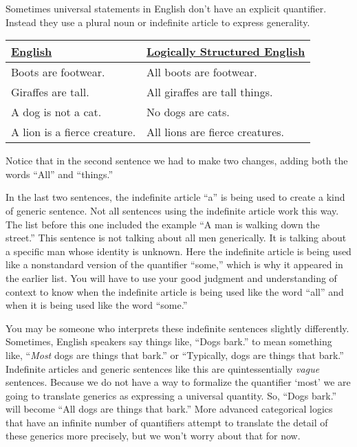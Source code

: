 Sometimes universal statements in English don't have an explicit quantifier. Instead they use a plural noun or indefinite article to express generality.

\begin{table}
\begin{longtabu}{p{.5\linewidth}p{.5\linewidth}}
\underline{English} &
\underline{Logically Structured English} \\
\endhead
Boots are footwear. & 
All boots are footwear.\\

Giraffes are tall. & 
All giraffes are tall things.\\

A dog is not a cat. & 
No dogs are cats.\\

A lion is a fierce creature. &
All lions are fierce creatures.\\

\end{longtabu}
\end{table}

\noindent Notice that in the second sentence we had to make two changes, adding both the words ``All'' and ``things.''

In the last two sentences, the indefinite article ``a'' is being used to create a kind of generic sentence. Not all sentences using the indefinite article work this way. The list before this one included the example ``A man is walking down the street.'' This sentence is not talking about all men generically. It is talking about a specific man whose identity is unknown. Here the indefinite article is being used like a nonstandard version of the quantifier ``some,'' which is why it appeared in the earlier list. You will have to use your good judgment and understanding of context to know when the indefinite article is being used like the word ``all'' and when it is being used like the word ``some.''

You may be someone who interprets these indefinite sentences slightly differently. Sometimes, English speakers say things like, ``Dogs bark.'' to mean something like, ``\emph{Most} dogs are things that bark.'' or ``Typically, dogs are things that bark.'' Indefinite articles and generic sentences like this are quintessentially \emph{vague} sentences. Because we do not have a way to formalize the quantifier `most' we are going to translate generics as expressing a universal quantity. So, ``Dogs bark.'' will become ``All dogs are things that bark.'' More advanced categorical logics that have an infinite number of quantifiers attempt to translate the detail of these generics more precisely, but we won't worry about that for now.

